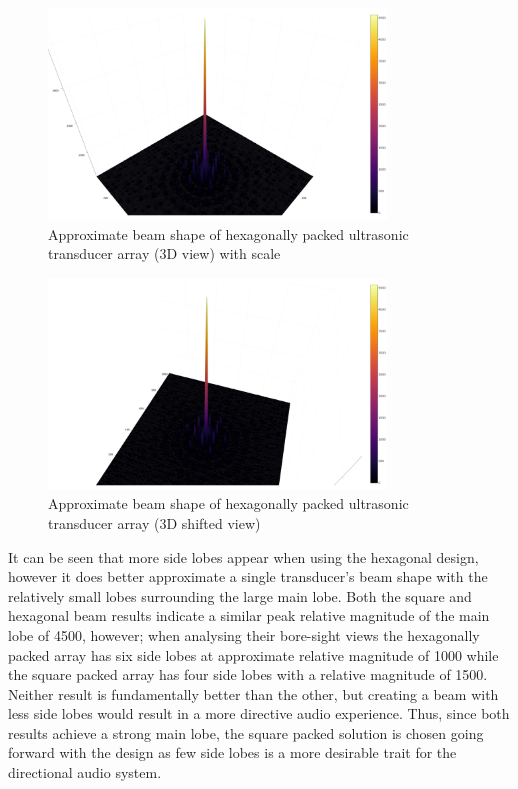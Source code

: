 \begin{figure}[ht!]
    \centering
    \includegraphics[width=0.8\textwidth]{Figures/arraySim/hex/beampat3dplaneview.png}
    \caption{Approximate beam shape of hexagonally packed ultrasonic transducer array (3D view) with scale}
    \label{fig:hex_elem_3Dbeamscale}
\end{figure}

\begin{figure}[ht!]
    \centering
    \includegraphics[width=0.8\textwidth]{Figures/arraySim/hex/beampat3d.png}
    \caption{Approximate beam shape of hexagonally packed ultrasonic transducer array (3D shifted view)}
    \label{fig:hex_elem_3Dbeam}
\end{figure}

It can be seen that more side lobes appear when using the hexagonal design, however it does better approximate a single transducer's beam shape with the relatively small lobes surrounding the large main lobe.
Both the square and hexagonal beam results indicate a similar peak relative magnitude of the main lobe of 4500, however; when analysing their bore-sight views the hexagonally packed array has six side lobes at approximate relative magnitude of 1000 while the square packed array has four side lobes with a relative magnitude of 1500. Neither result is fundamentally better than the other, but creating a beam with less side lobes would result in a more directive audio experience. Thus, since both results achieve a strong main lobe, the square packed solution is chosen going forward with the design as few side lobes is a more desirable trait for the directional audio system.
\newpage

